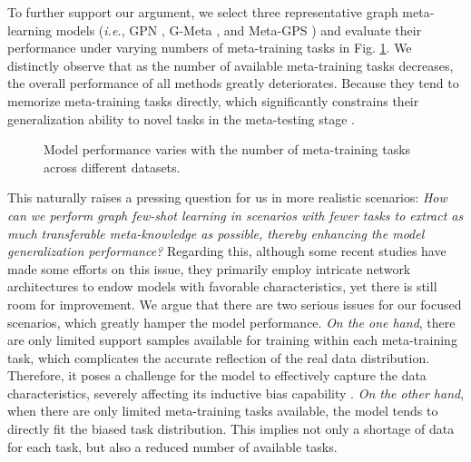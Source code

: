 To further support our argument, we select three representative graph meta-learning models (\textit{i.e.}, GPN \cite{ding2020graph}, G-Meta \cite{huang2020graph}, and Meta-GPS \cite{liu2022few}) and evaluate their performance under varying numbers of meta-training tasks in Fig. \ref{comparison}. We distinctly observe that as the number of available meta-training tasks decreases, the overall performance of all methods greatly deteriorates. Because they tend to memorize meta-training tasks directly, which significantly constrains their generalization ability to novel tasks in the meta-testing stage \cite{rajendran2020meta}.
\begin{figure}
    \centering
    \caption{Model performance varies with the number of meta-training tasks across different datasets.}
    \label{comparison}
\end{figure}
This naturally raises a pressing question for us in more realistic scenarios: \textit{How can we perform graph few-shot learning in scenarios with fewer tasks to extract as much transferable meta-knowledge as possible, thereby enhancing the model generalization performance?} Regarding this, although some recent studies \cite{tan2023virtual, kim2023task} have made some efforts on this issue, they primarily employ intricate network architectures to endow models with favorable characteristics, yet there is still room for improvement. We argue that there are two serious issues for our focused scenarios, which greatly hamper the model performance. \textit{On the one hand}, there are only limited support samples available for training within each meta-training task, which complicates the accurate reflection of the real data distribution. Therefore, it poses a challenge for the model to effectively capture the data characteristics, severely affecting its inductive bias capability \cite{ni2021data}. \textit{On the other hand}, when there are only limited meta-training tasks available, the model tends to directly fit the biased task distribution. This implies not only a shortage of data for each task, but also a reduced number of available tasks. %
